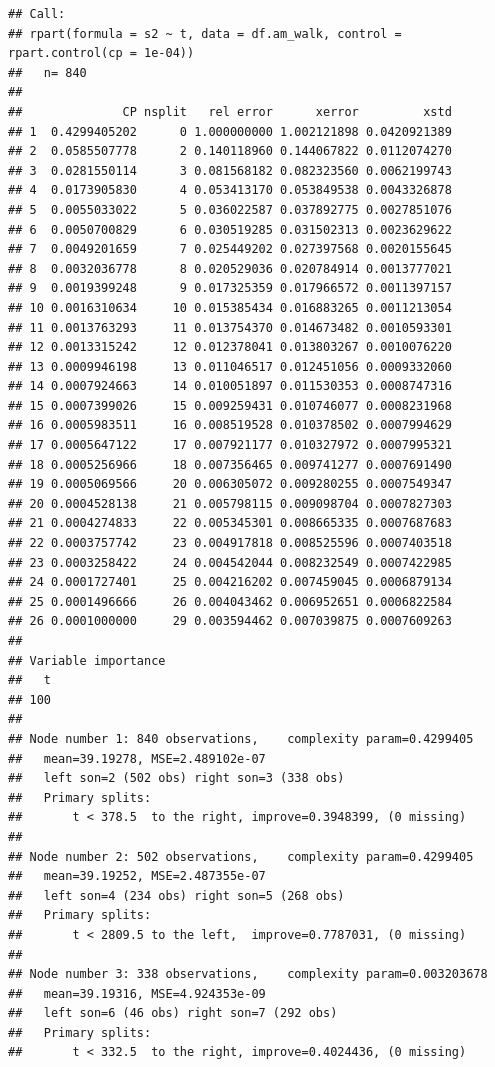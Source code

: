 \documentclass[
]{book}
\begin{document}
\begin{verbatim}
## Call:
## rpart(formula = s2 ~ t, data = df.am_walk, control = rpart.control(cp = 1e-04))
##   n= 840 
## 
##              CP nsplit   rel error      xerror         xstd
## 1  0.4299405202      0 1.000000000 1.002121898 0.0420921389
## 2  0.0585507778      2 0.140118960 0.144067822 0.0112074270
## 3  0.0281550114      3 0.081568182 0.082323560 0.0062199743
## 4  0.0173905830      4 0.053413170 0.053849538 0.0043326878
## 5  0.0055033022      5 0.036022587 0.037892775 0.0027851076
## 6  0.0050700829      6 0.030519285 0.031502313 0.0023629622
## 7  0.0049201659      7 0.025449202 0.027397568 0.0020155645
## 8  0.0032036778      8 0.020529036 0.020784914 0.0013777021
## 9  0.0019399248      9 0.017325359 0.017966572 0.0011397157
## 10 0.0016310634     10 0.015385434 0.016883265 0.0011213054
## 11 0.0013763293     11 0.013754370 0.014673482 0.0010593301
## 12 0.0013315242     12 0.012378041 0.013803267 0.0010076220
## 13 0.0009946198     13 0.011046517 0.012451056 0.0009332060
## 14 0.0007924663     14 0.010051897 0.011530353 0.0008747316
## 15 0.0007399026     15 0.009259431 0.010746077 0.0008231968
## 16 0.0005983511     16 0.008519528 0.010378502 0.0007994629
## 17 0.0005647122     17 0.007921177 0.010327972 0.0007995321
## 18 0.0005256966     18 0.007356465 0.009741277 0.0007691490
## 19 0.0005069566     20 0.006305072 0.009280255 0.0007549347
## 20 0.0004528138     21 0.005798115 0.009098704 0.0007827303
## 21 0.0004274833     22 0.005345301 0.008665335 0.0007687683
## 22 0.0003757742     23 0.004917818 0.008525596 0.0007403518
## 23 0.0003258422     24 0.004542044 0.008232549 0.0007422985
## 24 0.0001727401     25 0.004216202 0.007459045 0.0006879134
## 25 0.0001496666     26 0.004043462 0.006952651 0.0006822584
## 26 0.0001000000     29 0.003594462 0.007039875 0.0007609263
## 
## Variable importance
##   t 
## 100 
## 
## Node number 1: 840 observations,    complexity param=0.4299405
##   mean=39.19278, MSE=2.489102e-07 
##   left son=2 (502 obs) right son=3 (338 obs)
##   Primary splits:
##       t < 378.5  to the right, improve=0.3948399, (0 missing)
## 
## Node number 2: 502 observations,    complexity param=0.4299405
##   mean=39.19252, MSE=2.487355e-07 
##   left son=4 (234 obs) right son=5 (268 obs)
##   Primary splits:
##       t < 2809.5 to the left,  improve=0.7787031, (0 missing)
## 
## Node number 3: 338 observations,    complexity param=0.003203678
##   mean=39.19316, MSE=4.924353e-09 
##   left son=6 (46 obs) right son=7 (292 obs)
##   Primary splits:
##       t < 332.5  to the right, improve=0.4024436, (0 missing)

\end{verbatim}
\end{document}
